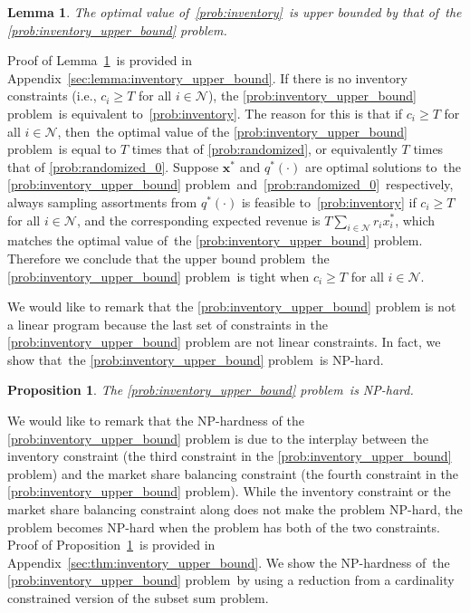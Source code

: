 \documentclass[mnsc,non-blindrev]{informs3}
\newtheorem{lemma}[theorem]{Lemma}
\newtheorem{proposition}[theorem]{Proposition}
\theoremstyle{definition}
\begin{document}
\vspace{0.5em}

\begin{lemma}\label{lemma:inventory_upper_bound}
The optimal value of~\ref{prob:inventory}~is upper bounded by that of~the \ref{prob:inventory_upper_bound} problem.
\end{lemma}

\vspace{0.5em}

Proof of Lemma~\ref{lemma:inventory_upper_bound}~is provided in Appendix~\ref{sec:lemma:inventory_upper_bound}. If there is no inventory constraints (i.e., $c_i\geq T$ for all $i\in\mathcal{N}$), the \ref{prob:inventory_upper_bound} problem~is equivalent to~\ref{prob:inventory}. The reason for this is that if $c_i\geq T$ for all $i\in\mathcal{N}$, then~the optimal value of the \ref{prob:inventory_upper_bound} problem~is equal to $T$ times that of \ref{prob:randomized}, or equivalently $T$ times that of \ref{prob:randomized_0}. Suppose $\bm{x}^*$ and $q^*(\cdot)$ are optimal solutions to~the \ref{prob:inventory_upper_bound} problem~and~\ref{prob:randomized_0}~respectively, always sampling assortments from $q^*(\cdot)$ is feasible to~\ref{prob:inventory} if $c_i\geq T$ for all $i\in\mathcal{N}$, and the corresponding expected revenue is $T\sum_{i\in\mathcal{N}}r_ix_i^*$, which matches the optimal value of~the \ref{prob:inventory_upper_bound} problem. Therefore we conclude that the upper bound problem~the \ref{prob:inventory_upper_bound} problem~is tight when $c_i\geq T$ for all $i\in\mathcal{N}$.

We would like to remark that the \ref{prob:inventory_upper_bound} problem is not a linear program because the last set of constraints in the \ref{prob:inventory_upper_bound} problem are not linear constraints. In fact, we show that~the \ref{prob:inventory_upper_bound} problem~is NP-hard.

\vspace{0.5em}

\begin{proposition}\label{thm:inventory_upper_bound}
The \ref{prob:inventory_upper_bound} problem~is NP-hard.
\end{proposition}

\vspace{0.5em}

{  We would like to remark that the NP-hardness of the \ref{prob:inventory_upper_bound} problem is due to the interplay between the inventory constraint (the third constraint in the \ref{prob:inventory_upper_bound} problem) and the market share balancing constraint (the fourth constraint in the \ref{prob:inventory_upper_bound} problem). While the inventory constraint or the market share balancing constraint along does not make the problem NP-hard, the problem becomes NP-hard when the problem has both of the two constraints.} Proof of Proposition~\ref{thm:inventory_upper_bound}~is provided in Appendix~\ref{sec:thm:inventory_upper_bound}. We show the NP-hardness of~the \ref{prob:inventory_upper_bound} problem~by using a reduction from a cardinality constrained version of the subset sum problem. 
\end{document}
